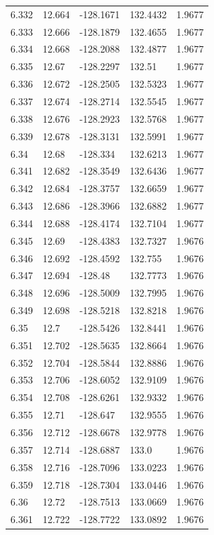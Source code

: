 \begin{tabular}{lllll}
6.332 & 12.664 & -128.1671 & 132.4432 & 1.9677 \\
6.333 & 12.666 & -128.1879 & 132.4655 & 1.9677 \\
6.334 & 12.668 & -128.2088 & 132.4877 & 1.9677 \\
6.335 & 12.67 & -128.2297 & 132.51 & 1.9677 \\
6.336 & 12.672 & -128.2505 & 132.5323 & 1.9677 \\
6.337 & 12.674 & -128.2714 & 132.5545 & 1.9677 \\
6.338 & 12.676 & -128.2923 & 132.5768 & 1.9677 \\
6.339 & 12.678 & -128.3131 & 132.5991 & 1.9677 \\
6.34 & 12.68 & -128.334 & 132.6213 & 1.9677 \\
6.341 & 12.682 & -128.3549 & 132.6436 & 1.9677 \\
6.342 & 12.684 & -128.3757 & 132.6659 & 1.9677 \\
6.343 & 12.686 & -128.3966 & 132.6882 & 1.9677 \\
6.344 & 12.688 & -128.4174 & 132.7104 & 1.9677 \\
6.345 & 12.69 & -128.4383 & 132.7327 & 1.9676 \\
6.346 & 12.692 & -128.4592 & 132.755 & 1.9676 \\
6.347 & 12.694 & -128.48 & 132.7773 & 1.9676 \\
6.348 & 12.696 & -128.5009 & 132.7995 & 1.9676 \\
6.349 & 12.698 & -128.5218 & 132.8218 & 1.9676 \\
6.35 & 12.7 & -128.5426 & 132.8441 & 1.9676 \\
6.351 & 12.702 & -128.5635 & 132.8664 & 1.9676 \\
6.352 & 12.704 & -128.5844 & 132.8886 & 1.9676 \\
6.353 & 12.706 & -128.6052 & 132.9109 & 1.9676 \\
6.354 & 12.708 & -128.6261 & 132.9332 & 1.9676 \\
6.355 & 12.71 & -128.647 & 132.9555 & 1.9676 \\
6.356 & 12.712 & -128.6678 & 132.9778 & 1.9676 \\
6.357 & 12.714 & -128.6887 & 133.0 & 1.9676 \\
6.358 & 12.716 & -128.7096 & 133.0223 & 1.9676 \\
6.359 & 12.718 & -128.7304 & 133.0446 & 1.9676 \\
6.36 & 12.72 & -128.7513 & 133.0669 & 1.9676 \\
6.361 & 12.722 & -128.7722 & 133.0892 & 1.9676 \\

\end{tabular}
